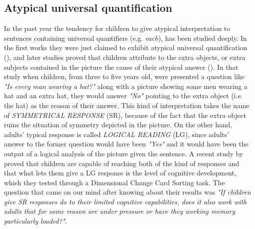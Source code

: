\documentclass[10pt, a4]{article}
\begin{document}
\subsection{Atypical universal quantification}
In the past year the tendency for children to give atypical interpretation to sentences containing universal quantifiers (e.g. \textit{each}),
has been studied deeply. In the first works they were just claimed to exhibit atypical universal quantification (\cite{piaget1964early}), and
later studies proved that children attribute to the extra objects, or extra subjects contained in the picture the cause of their atypical answer (\cite{philip1994event}).
In that study when children, from three to five years old, were presented a question like \textit{"Is every man wearing a hat?"} along with a picture showing
some men wearing a hat and an extra hat, they would answer \textit{"No"} pointing to the extra object (i.e. the hat) as the reason of their answer.
This kind of interpretation takes the name of \textit{SYMMETRICAL RESPONSE} (SR), because of the fact that the extra object ruins the situation
of symmetry depicted in the picture. On the other hand, adults' typical response is called \textit{LOGICAL READING} (LG), since adults' answer to the
former question would have been \textit{"Yes"} and it would have been the output of a logical analysis of the picture given the sentence.
A recent study by \cite{minai2012hinders} proved that children are capable of reaching both of the kind of responses and that what lets them give a
LG response is the level of cognitive development, which they tested through a Dimensional Change Card Sorting task.
The question that came on our mind after knowing about their results was \textit{"If children give SR responses do to their limited cognitive capabilities,
does it also work with adults that for some reason are under pressure or have they working memory particularly loaded?"}.
\end{document}

